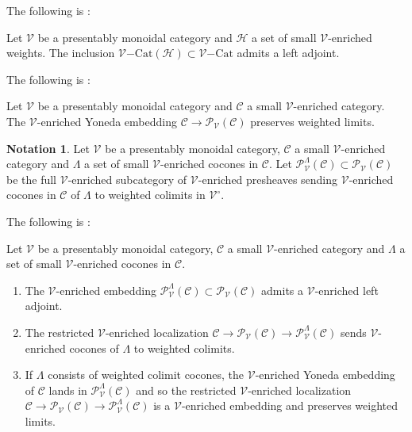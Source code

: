 \documentclass[10pt,oneside]{article}
\numberwithin{equation}{section} %
\numberwithin{figure}{section} %
\theoremstyle{plain}
\theoremstyle{definition}
\newtheorem{notation}[thm]{Notation}
\newcommand{\mC}{{\mathcal C}}
\newcommand{\mH}{{\mathcal H}}
\newcommand{\mP}{{\mathcal P}}
\newcommand{\mV}{{\mathcal V}}
\newcommand{\Cat}{\mathrm{Cat}}
\begin{document}
The following is \cite[Proposition 4.47.]{heine2024higher}:

\begin{proposition}\label{weiadj} Let $\mV$ be a presentably monoidal category and $\mH$ a set of small $\mV$-enriched weights.
The inclusion $\mV \mathrm{-}\Cat(\mH) \subset \mV \mathrm{-}\Cat$ admits a left adjoint.

\end{proposition}

The following is \cite[Corollary 3.68.]{heine2024higher}:

\begin{proposition}\label{weiadj} Let $\mV$ be a presentably monoidal category and $\mC$ a small $\mV$-enriched category.
The $\mV$-enriched Yoneda embedding $\mC \to \mP_\mV(\mC)$ preserves weighted limits.

\end{proposition}

\begin{notation}Let $\mV$ be a presentably monoidal category, $\mC$ a small $\mV$-enriched category and $\Lambda$ a set of small $\mV$-enriched cocones in $\mC$. Let $\mP^\Lambda_\mV(\mC) \subset \mP_\mV(\mC)$ be the full $\mV$-enriched subcategory of $\mV$-enriched presheaves sending $\mV$-enriched cocones in $\mC$ of $\Lambda$ to weighted colimits in $\mV^\circ$.
    
\end{notation}

The following is \cite[Lemma 3.80., Remark 3.85.]{heine2024higher}:

\begin{proposition}\label{weiloc} Let $\mV$ be a presentably monoidal category, $\mC$ a small $\mV$-enriched category and $\Lambda$ a set of small $\mV$-enriched cocones in $\mC$.

\begin{enumerate}[\normalfont(1)]\setlength{\itemsep}{-2pt}

\item The $\mV$-enriched embedding $\mP^\Lambda_\mV(\mC) \subset \mP_\mV(\mC)$ admits a $\mV$-enriched left adjoint.

\item The restricted $\mV$-enriched localization $\mC \to \mP_\mV(\mC) \to \mP^\Lambda_\mV(\mC)$ sends $\mV$-enriched cocones of $\Lambda$ to weighted colimits.

\item If $\Lambda$ consists of weighted colimit cocones, the 
$\mV$-enriched Yoneda embedding of $\mC$ lands in $\mP^\Lambda_\mV(\mC)$
and so the restricted $\mV$-enriched localization $\mC \to \mP_\mV(\mC) \to \mP^\Lambda_\mV(\mC)$ is a $\mV$-enriched embedding and preserves 
weighted limits.

\end{enumerate}

\end{proposition}
\end{document}

